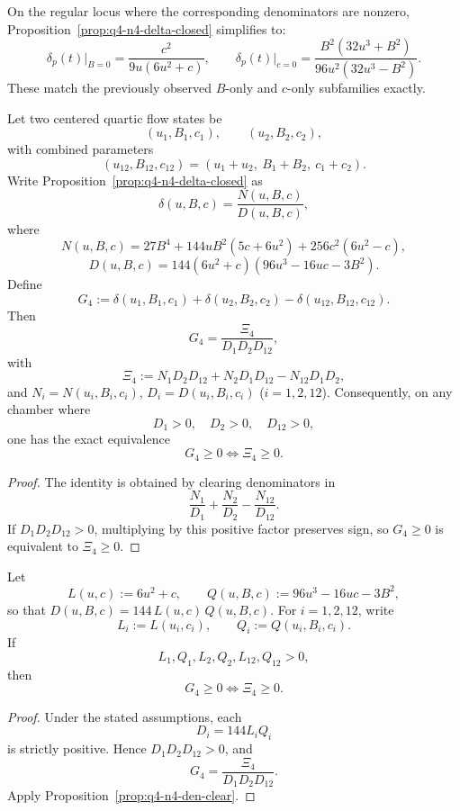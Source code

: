 \begin{remark}
On the regular locus where the corresponding denominators are nonzero,
Proposition~\ref{prop:q4-n4-delta-closed} simplifies to:
\[
\delta_p(t)\big|_{B=0}
=\frac{c^2}{9u(6u^2+c)},
\qquad
\delta_p(t)\big|_{c=0}
=\frac{B^2(32u^3+B^2)}{96u^2(32u^3-B^2)}.
\]
These match the previously observed $B$-only and $c$-only subfamilies exactly.
\end{remark}

\begin{proposition}\label{prop:q4-n4-den-clear}
Let two centered quartic flow states be
\[
(u_1,B_1,c_1),\qquad (u_2,B_2,c_2),
\]
with combined parameters
\[
(u_{12},B_{12},c_{12})=(u_1+u_2,\ B_1+B_2,\ c_1+c_2).
\]
Write Proposition~\ref{prop:q4-n4-delta-closed} as
\[
\delta(u,B,c)=\frac{N(u,B,c)}{D(u,B,c)},
\]
where
\[
N(u,B,c)=27B^4+144uB^2(5c+6u^2)+256c^2(6u^2-c),
\]
\[
D(u,B,c)=144(6u^2+c)(96u^3-16uc-3B^2).
\]
Define
\[
G_4:=\delta(u_1,B_1,c_1)+\delta(u_2,B_2,c_2)-\delta(u_{12},B_{12},c_{12}).
\]
Then
\[
G_4=\frac{\Xi_4}{D_1D_2D_{12}},
\]
with
\[
\Xi_4:=N_1D_2D_{12}+N_2D_1D_{12}-N_{12}D_1D_2,
\]
and $N_i=N(u_i,B_i,c_i)$, $D_i=D(u_i,B_i,c_i)$ ($i=1,2,12$).
Consequently, on any chamber where
\[
D_1>0,\quad D_2>0,\quad D_{12}>0,
\]
one has the exact equivalence
\[
G_4\ge 0 \iff \Xi_4\ge 0.
\]
\end{proposition}

\begin{proof}
The identity is obtained by clearing denominators in
\[
\frac{N_1}{D_1}+\frac{N_2}{D_2}-\frac{N_{12}}{D_{12}}.
\]
If $D_1D_2D_{12}>0$, multiplying by this positive factor preserves sign, so
$G_4\ge 0$ is equivalent to $\Xi_4\ge 0$.
\end{proof}

\begin{corollary}\label{cor:q4-n4-factor-chamber}
Let
\[
L(u,c):=6u^2+c,\qquad Q(u,B,c):=96u^3-16uc-3B^2,
\]
so that $D(u,B,c)=144\,L(u,c)\,Q(u,B,c)$.
For $i=1,2,12$, write
\[
L_i:=L(u_i,c_i),\qquad Q_i:=Q(u_i,B_i,c_i).
\]
If
\[
L_1,Q_1,L_2,Q_2,L_{12},Q_{12}>0,
\]
then
\[
G_4\ge 0\iff \Xi_4\ge 0.
\]
\end{corollary}

\begin{proof}
Under the stated assumptions, each
\[
D_i=144L_iQ_i
\]
is strictly positive. Hence $D_1D_2D_{12}>0$, and
\[
G_4=\frac{\Xi_4}{D_1D_2D_{12}}.
\]
Apply Proposition~\ref{prop:q4-n4-den-clear}.
\end{proof}

